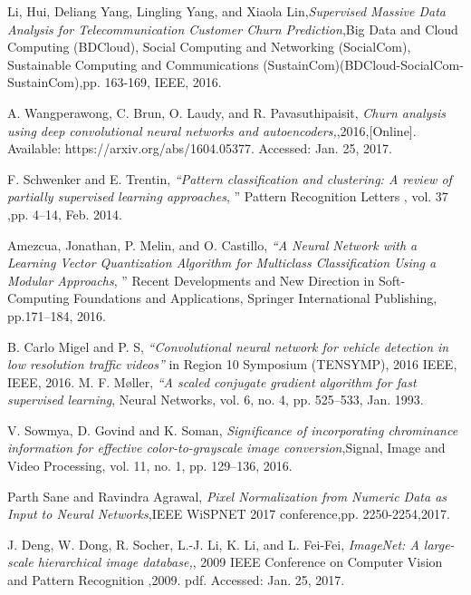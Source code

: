 

{}
\begin{thebibliography}{99}

Li, Hui, Deliang Yang, Lingling Yang, and Xiaola Lin,\emph{Supervised Massive Data Analysis for Telecommunication Customer Churn Prediction},Big Data and Cloud Computing (BDCloud), Social Computing and Networking (SocialCom), Sustainable Computing and Communications (SustainCom)(BDCloud-SocialCom-SustainCom),pp. 163-169, IEEE, 2016.

 A. Wangperawong, C. Brun, O. Laudy, and R. Pavasuthipaisit, \emph{Churn analysis using deep convolutional neural networks and autoencoders,},2016,[Online]. Available: https://arxiv.org/abs/1604.05377.
 Accessed: Jan. 25, 2017.
 
 F. Schwenker and E. Trentin, \emph{“Pattern classification and clustering: A review of partially supervised learning approaches}, ” Pattern Recognition Letters , vol. 37 ,pp. 4–14, Feb. 2014.

Amezcua, Jonathan, P. Melin, and O. Castillo, \emph{“A Neural Network with a Learning Vector Quantization Algorithm for Multiclass Classification Using a Modular Approachs}, ” Recent Developments and New Direction in Soft-Computing Foundations and Applications, Springer International Publishing,  pp.171–184, 2016.

B. Carlo Migel and P. S, \emph{“Convolutional neural network for vehicle detection in low resolution traffic videos”} in Region 10 Symposium (TENSYMP), 2016 IEEE, IEEE, 2016.
M. F. Møller, \emph{“A scaled conjugate gradient algorithm for fast supervised learning}, Neural Networks, vol. 6, no. 4, pp. 525–533, Jan. 1993.

V. Sowmya, D. Govind and K. Soman, \emph{Significance of incorporating chrominance information for effective color-to-grayscale image conversion},Signal, Image and Video Processing, vol. 11, no. 1, pp. 129–136,
2016.

Parth Sane and Ravindra Agrawal, \emph{Pixel Normalization from Numeric Data
	as Input to Neural Networks},IEEE WiSPNET 2017 conference,pp. 2250-2254,2017.

J. Deng, W. Dong, R. Socher, L.-J. Li, K. Li, and L. Fei-Fei, \emph{ImageNet: A large-scale hierarchical image database,}, 2009 IEEE Conference on Computer Vision and Pattern Recognition ,2009.
pdf. Accessed: Jan. 25, 2017.


\end{thebibliography}
